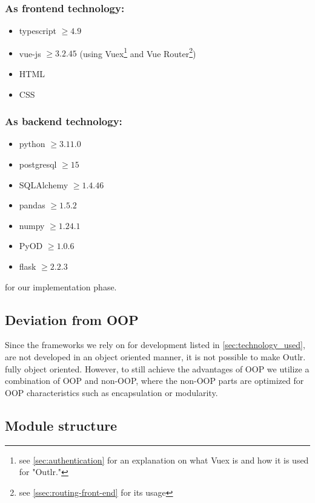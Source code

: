 \subsubsection*{As frontend technology:}
\begin{itemize}
    \item \Gls{typescript} $\geq 4.9$
    \item \Gls{vue-js} $\geq 3.2.45$ (using Vuex\footnote{see \ref{sec:authentication} for an explanation on what Vuex is and how it is used for "Outlr."} and Vue Router\footnote{see \ref{ssec:routing-front-end} for its usage})
    \item \Gls{HTML}
    \item \Gls{CSS}
\end{itemize}
    
\subsubsection*{As backend technology:}
\begin{itemize}
    \item \Gls{python} $\geq 3.11.0$
    \item \Gls{postgresql} $\geq 15$
    \item \Gls{SQLAlchemy} $\geq 1.4.46 $
    \item \Gls{pandas} $\geq 1.5.2$
    \item \Gls{numpy} $\geq 1.24.1 $
    \item \Gls{PyOD} $\geq 1.0.6$
    \item \Gls{flask} $\geq 2.2.3$   
\end{itemize}

for our implementation phase.

\subsection{Deviation from OOP}
Since the frameworks we rely on for development listed in \ref{sec:technology_used}, are not developed in an object oriented manner, it is not possible to make Outlr. fully object oriented.
However, to still achieve the advantages of OOP we utilize a combination of OOP and non-OOP, where the non-OOP parts are optimized for OOP characteristics such as encapsulation or modularity.

\newpage
\subsection{Module structure}
\label{sec:module-structure}

